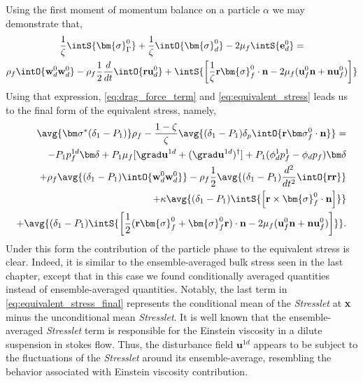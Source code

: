 Using the first moment of momentum balance on a particle $\alpha$ we may demonstrate that, 
\begin{multline}
    \frac{1}{\zeta}\intS{ \bm{\sigma}_\Gamma^0}
    +
    \frac{1}{\zeta}
    \intO{ \bm{\sigma}_d^0}
    - 2\mu_f \intS{ \textbf{e}^0_d}
    = \\
    \rho_f \intO{ \textbf{w}_d^0\textbf{w}_d^0 }
    - \rho_f \frac{1}{2}\frac{d}{dt} \intO{\textbf{ru}_d^0} 
    +
    \intS{\left[
        \frac{1}{\zeta}
        \textbf{r}\bm{\sigma}_f^0 \cdot \textbf{n}
        -2 \mu_f (\textbf{u}_f^0 \textbf{n} + \textbf{n} \textbf{u}_f^0)
        \right] 
    }
    \label{eq:dt_P1_alpha_bis_bis}
\end{multline}
Using that expression,  \ref{eq:drag_force_term} and \ref{eq:equivalent_stress} leads us to the final form of the equivalent stress, namely, 
\begin{align}
    \avg{\bm\sigma^* (\delta_1 - P_1)} \rho_f - \frac{1-\zeta}{\zeta}\avg{ (\delta_1 - P_1) \delta_p \intO{\textbf{r}\bm\sigma_f^0\cdot \textbf{n}}} = \nonumber \\
    - P_1  p_f^{1d}\bm\delta
    + P_1 \mu_f [\grad \textbf{u}^{1d}+(\grad \textbf{u}^{1d})^\dagger] 
    +P_1 (\phi_d^1 p_f^1 - \phi_d p_f)\bm\delta \nonumber  \\
    + \rho_f \avg{(\delta_1 - P_1) \intO{\textbf{w}_d^0\textbf{w}_d^0 }}
    - \rho_f \frac{1}{2}\avg{(\delta_1 - P_1)\frac{d^2}{dt^2} \intO{\textbf{rr}} } \nonumber \\
    + \kappa \avg{(\delta_1 - P_1) \intS{\left[
         \textbf{r}\times \bm{\sigma}_f^0 \cdot \textbf{n}
        \right] 
    }}  \\
    + \avg{(\delta_1 - P_1) \intS{\left[
         \frac{1}{2}(\textbf{r}\bm{\sigma}_f^0+\bm{\sigma}_f^0\textbf{r}) \cdot \textbf{n}
        -  2 \mu_f (\textbf{u}_f^0 \textbf{n} + \textbf{n} \textbf{u}_f^0)
        \right] 
    }}.  
    \label{eq:equivalent_stress_final}
\end{align}
Under this form the contribution of the particle phase to the equivalent stress is clear. 
Indeed, it is similar to the ensemble-averaged bulk stress seen in the last chapter, except that in this case we found conditionally averaged quantities instead of ensemble-averaged quantities. 
Notably, the last term in \ref{eq:equivalent_stress_final} represents the conditional mean of the \textit{Stresslet} at \textbf{x} minus the unconditional mean \textit{Stresslet}. 
It is well known that the ensemble-averaged \textit{Stresslet} term is responsible for the Einstein viscosity in a dilute suspension in stokes flow. 
Thus, the disturbance field $\textbf{u}^{1d}$ appears to be subject to the fluctuations of the \textit{Stresslet} around its ensemble-average, resembling the behavior associated with Einstein viscosity contribution. 

